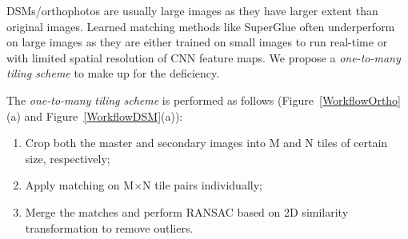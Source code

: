 DSMs/orthophotos are usually large images as they have larger extent than original images.
Learned matching methods like SuperGlue often underperform on large images as they are either trained on small images to run real-time or with limited spatial resolution of CNN feature maps. We propose a \textit{one-to-many tiling scheme} to make up for the deficiency. 
\par
The \textit{one-to-many tiling scheme} is performed as follows (Figure~\ref{WorkflowOrtho}(a) and Figure~\ref{WorkflowDSM}(a)):\\
\begin{enumerate}
    \item Crop both the master and secondary images into M and N tiles of certain size, respectively;
    \item Apply matching on M$\times$N tile pairs individually;
    \item Merge the matches and perform RANSAC based on 2D similarity transformation to remove outliers.
\end{enumerate}

